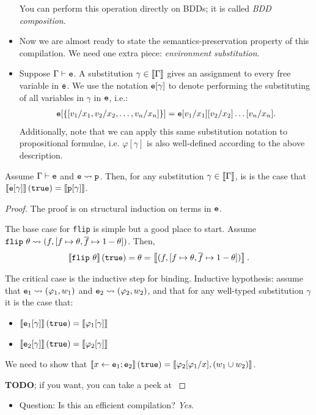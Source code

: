 \documentclass{tufte-handout}
\begin{document}
\begin{itemize}
  You can perform this operation directly on BDDs; it is called \emph{BDD
  composition}.

  \item Now we are almost ready to state the semantics-preservation property of
  this compilation. We need one extra piece: \emph{environment substitution}.
  \item Suppose $\Gamma \vdash \texttt{e}$. A substitution $\gamma \in \left \llbracket {\Gamma} \right \rrbracket$ 
  gives an assignment to every free variable in $\texttt{e}$. We use the notation 
  $\texttt{e}[\gamma]$ to denote performing the substituting of all variables 
  in $\gamma$ in $\texttt{e}$, i.e.:
  \begin{align*}
    \texttt{e}[\{[v_1/x_1, v_2/x_2, \dots, v_n/x_n]\}] = \texttt{e}[v_1/x_1][v_2/x_2]\dots[v_n/x_n].
  \end{align*}
  Additionally, note that we can apply this same substitution notation to 
  propositional formulae, i.e. $\varphi[\gamma]$ is also well-defined 
  according to the above description.
\end{itemize}

\begin{theorem}
Assume $\Gamma \vdash \texttt{e}$ and $\texttt{e} \rightsquigarrow \texttt{p}$. Then, for any substitution
$\gamma \in \left \llbracket {\Gamma} \right \rrbracket$, is is the case that 
$\left \llbracket {\texttt{e}[\gamma]} \right \rrbracket(\texttt{true}) = \left \llbracket {\texttt{p}[\gamma]} \right \rrbracket$.
\end{theorem}
\begin{proof}
  The proof is on structural induction on terms in $\texttt{e}$. 

  The base case for \texttt{flip} is simple but a good place to start. Assume $\texttt{flip}~\theta 
  \rightsquigarrow (f, [f \mapsto \theta, \overline{f} \mapsto 1-\theta])$. Then,
  \begin{align*}
    \left \llbracket {\texttt{flip}~\theta} \right \rrbracket(\texttt{true}) = \theta =  \left \llbracket {(f, [f \mapsto \theta, \overline{f} \mapsto 1-\theta])} \right \rrbracket.
  \end{align*}

  The critical case is the inductive step for binding. Inductive hypothesis:
  assume that $\texttt{e}_1 \rightsquigarrow (\varphi_1, w_1)$ and $\texttt{e}_2 \rightsquigarrow (\varphi_2, w_2)$, 
  and that for any well-typed substitution $\gamma$ it is the case that:
  \begin{itemize}
    \item $\left \llbracket {\texttt{e}_1[\gamma]} \right \rrbracket(\texttt{true}) = \left \llbracket {\varphi_1[\gamma]} \right \rrbracket$
    \item $\left \llbracket {\texttt{e}_2[\gamma]} \right \rrbracket(\texttt{true}) = \left \llbracket {\varphi_2[\gamma]} \right \rrbracket$
  \end{itemize}
  We need to show that $\left \llbracket {x \leftarrow \texttt{e}_1; \texttt{e}_2} \right \rrbracket(\texttt{true}) =
  \left \llbracket {\varphi_2[\varphi_1/x], (w_1 \cup w_2)} \right \rrbracket$.

  \textbf{TODO}; if you want, you can take a peek at \citet{holtzen2020scaling}

\end{proof}

\begin{itemize}
  \item Question: Is this an efficient compilation? \emph{Yes}.
\end{itemize}




\end{document}
